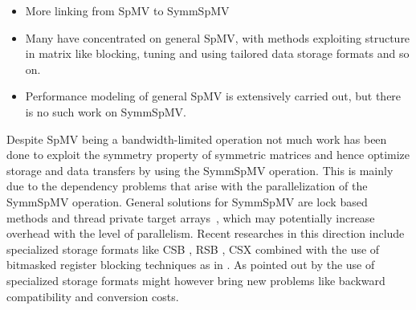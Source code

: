 \begin{itemize}
	\item More linking from \acrshort{SpMV} to \acrshort{SymmSpMV}
	\item Many have concentrated on general \acrshort{SpMV}, with methods exploiting
	 structure in matrix like blocking, tuning and using tailored data storage formats and so on.
	 \item Performance modeling of general \acrshort{SpMV} is extensively carried out,
	 but there is no such work on \acrshort{SymmSpMV}.
\end{itemize}



Despite \acrshort{SpMV} being a bandwidth-limited operation not much work has 
been done to exploit the symmetry property of symmetric matrices and hence optimize
storage and data transfers by using the \acrfull{SymmSpMV} operation.
This
is mainly due to the dependency problems that arise with the parallelization of the 
\acrshort{SymmSpMV} operation. General solutions for \acrshort{SymmSpMV} are 
lock based methods and thread private target
arrays~\cite{sparseX,thread_private_symm_spmv,Krotkiewski:2010:PSS:1752612.1752682},
which may potentially increase overhead with the level of parallelism.
Recent researches in this direction include specialized storage formats 
like CSB \cite{CSB}, RSB \cite{RSB}, CSX \cite{sparseX} combined with the use of bitmasked 
register blocking techniques as in \cite{Buluc:2011:RMA:2058524.2059503}. As pointed out 
by \cite{liu2015spmv} the use of specialized storage formats  might however
bring new problems like backward compatibility and conversion costs. 

